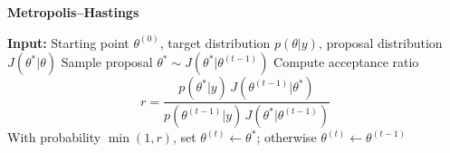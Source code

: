 \documentclass{article}
\begin{document}
\begin{algorithm}
\caption{\textbf{Metropolis--Hastings}}
\begin{algorithmic}
\State \textbf{Input:} Starting point $\theta^{(0)}$, target distribution $p(\theta|y)$, proposal distribution $J(\theta^*|\theta)$
  \State Sample proposal $\theta^* \sim J(\theta^* | \theta^{(t-1)})$
  \State Compute acceptance ratio
  \[
    r = 
    \frac{
      p(\theta^*|y) \, J(\theta^{(t-1)}|\theta^*)
    }{
      p(\theta^{(t-1)}|y) \, J(\theta^*|\theta^{(t-1)})
    }
  \]
  \State With probability $\min(1, r)$, set $\theta^{(t)} \leftarrow \theta^*$; otherwise $\theta^{(t)} \leftarrow \theta^{(t-1)}$
\EndWhile
\end{algorithmic}
\end{algorithm}
\end{document}
